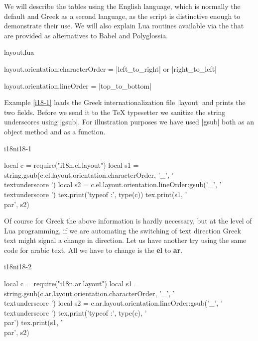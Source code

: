 We will describe the tables using the English language, which is normally the default and Greek as a second language, as the script is distinctive enough to demonstrate their use. We will also explain Lua routines available via the  that are provided as alternatives to Babel and Polyglossia.

{layout.lua}

{layout.orientation.characterOrder} = |left_to_right| or |right_to_left|

layout.orientation.lineOrder = |top_to_bottom|

Example \ref{i18-1} loads the Greek internationalization file |layout| and prints the two fields. Before we send it to
the TeX typesetter we sanitize the string underscores using |gsub|. For illustration purposes we have used |gsub| both as an object method and as a function.

\begin{texexample}{i18n}{i18-1}
\begin{luacode}
local c = require("i18n.el.layout")
local s1 = string.gsub(c.el.layout.orientation.characterOrder, '_', '\\textunderscore ')
local s2 = c.el.layout.orientation.lineOrder:gsub('_', '\\textunderscore ')
tex.print('typeof :', type(c))
tex.print(s1, '\\par', s2)
\end{luacode}
\end{texexample}

Of course for Greek the above information is hardly necessary, but at the level of Lua programming, if we are automating the switching of text direction Greek text might signal a change in direction. Let us have another try using the same code for arabic text. All we have to change is the \textbf{el} to \textbf{ar}.

\begin{texexample}{i18n}{i18-2}
\begin{luacode}
local c = require("i18n.ar.layout")
local s1 = string.gsub(c.ar.layout.orientation.characterOrder, '_', '\\textunderscore ')
local s2 = c.ar.layout.orientation.lineOrder:gsub('_', '\\textunderscore ')
tex.print('typeof :', type(c), '\\par')
tex.print(s1, '\\par', s2)
\end{luacode}
\end{texexample}

